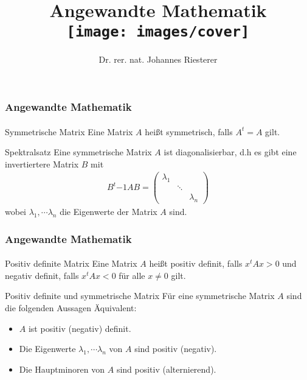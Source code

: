 \documentclass{beamer}
\begin{document}
\title[Angewandte Mathematik] %
{Angewandte Mathematik
\\
\texttt{[image: images/cover]}
}
\subtitle{}
\author[Dr. Johannes Riesterer] %
{Dr.  rer. nat. Johannes Riesterer}

\date[KPT 2004] %
{}

\subject{Angewandte Mathematik}

\frame{\titlepage}

\begin{frame}
    \frametitle{Angewandte Mathematik}
\framesubtitle{}
    \begin{block}{Symmetrische Matrix}
Eine Matrix $A$ heißt symmetrisch, falls $A^t = A$ gilt.
\end{block}

\begin{block}{Spektralsatz}
Eine symmetrische Matrix $A$ ist diagonalisierbar, d.h es gibt eine invertiertere Matrix $B$ mit 
\begin{align*}
B^t{-1}A B = \begin{pmatrix}    \lambda_{1} & & \\
    & \ddots & \\
    & & \lambda_{n}\end{pmatrix}
\end{align*}
wobei $\lambda_1, \cdots \lambda_n$ die Eigenwerte der Matrix $A$ sind. 
\end{block}

 \end{frame}

\begin{frame}
    \frametitle{Angewandte Mathematik}
\framesubtitle{}
    \begin{block}{Positiv definite  Matrix}
Eine Matrix $A$ heißt positiv definit, falls $x^t Ax > 0$ und negativ definit, falls  $x^t Ax < 0$ für alle $x \neq 0$ gilt.
\end{block}

    \begin{block}{Positiv definite und symmetrische  Matrix}
Für eine symmetrische Matrix $A$ sind die folgenden Aussagen Äquivalent:
\begin{itemize}
\item $A$ ist positiv  (negativ) definit.
\item Die Eigenwerte $\lambda_1, \cdots \lambda_n$ von $A$ sind positiv (negativ).
\item Die Hauptminoren von $A$ sind positiv (alternierend).
\end{itemize}

\end{block}

 \end{frame}
\end{document}
